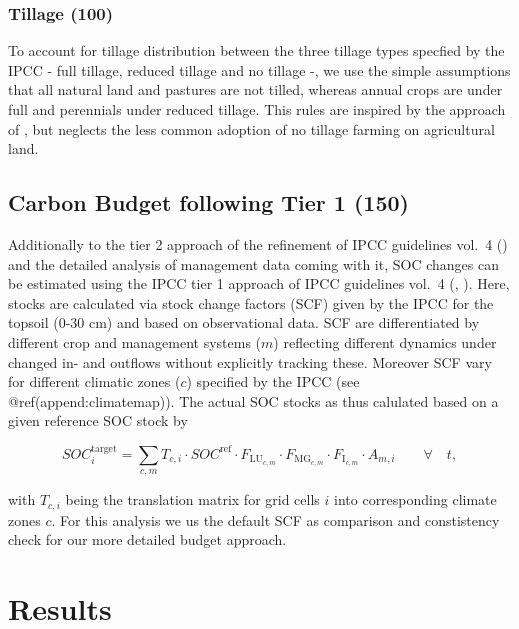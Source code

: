 \documentclass[gc, manuscript]{copernicus}
\begin{document}
\subsubsection{Tillage (100)}

To account for tillage distribution between the three tillage types
specfied by the IPCC - full tillage, reduced tillage and no tillage -,
we use the simple assumptions that all natural land and pastures are not
tilled, whereas annual crops are under full and perennials under reduced
tillage. This rules are inspired by the approach of \citep{porvolik},
but neglects the less common adoption of no tillage farming on
agricultural land.

\newpage

\hypertarget{sec:tier1}{%
\subsection{Carbon Budget following Tier 1 (150)}\label{sec:tier1}}

Additionally to the tier 2 approach of the refinement of IPCC guidelines
vol.~4 (\citet{ipcc_2019_2019}) and the detailed analysis of management
data coming with it, SOC changes can be estimated using the IPCC tier 1
approach of IPCC guidelines vol.~4 (\citet{ipcc_2006_2006},
\citet{ipcc_2019_2019}). Here, stocks are calculated via stock change
factors (SCF) given by the IPCC for the topsoil (0-30 cm) and based on
observational data. SCF are differentiated by different crop and
management systems (\(m\)) reflecting different dynamics under changed
in- and outflows without explicitly tracking these. Moreover SCF vary
for different climatic zones (\(c\)) specified by the IPCC (see
@ref(append:climatemap)). The actual SOC stocks as thus calulated based
on a given reference SOC stock by

\begin{equation}
SOC^{\text{target}}_{i} = \sum_{c,m} T_{c,i} \cdot SOC^{\text{ref}} \cdot F_{\text{LU}_{c,m}} \cdot F_{\text{MG}_{c,m}} \cdot F_{\text{I}_{c,m}} \cdot A_{m,i} \qquad\forall\quad t,
\label{eq:tier1}
\end{equation}

with \(T_{c,i}\) being the translation matrix for grid cells \(i\) into
corresponding climate zones \(c\). For this analysis we us the default
SCF as comparison and constistency check for our more detailed budget
approach.

\newpage

\section{Results}
\end{document}
